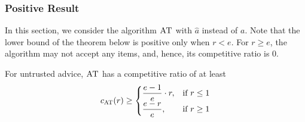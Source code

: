 \documentclass[a4paper,UKenglish,cleveref, autoref, thm-restate]{lipics-v2021}
\newcommand{\ADB}{\ensuremath{\operatorname{\textsc{AT}}}\xspace}
\newcommand{\ADBML}{\ensuremath{\operatorname{\textsc{AT}}}\xspace}
\newcommand{\guess}{\ensuremath{\hat{a}}\xspace}
\begin{document}
\subsubsection{Positive Result}
\label{sec:advicealg}
In this section, we consider the algorithm \ADB with \guess instead of $a$.
Note that the lower bound of the theorem below is positive only when
$r < e$. For $r \geq e$, the algorithm may not accept any items, and,
hence, its competitive ratio is $0$.


\begin{theorem}
  \label{thm:adbp}
  For untrusted advice, \ADBML 
  has a competitive ratio of at least
  \begin{align*}
    c_{\ADB}(r) \geq
    \begin{cases}
      \displaystyle \frac{e-1}{e} \cdot r, & \text{if }r \leq 1\\
      \displaystyle \frac{e-r}{e}, & \text{if } r \geq 1
    \end{cases}
    \end{align*}
\end{theorem}
\end{document}
